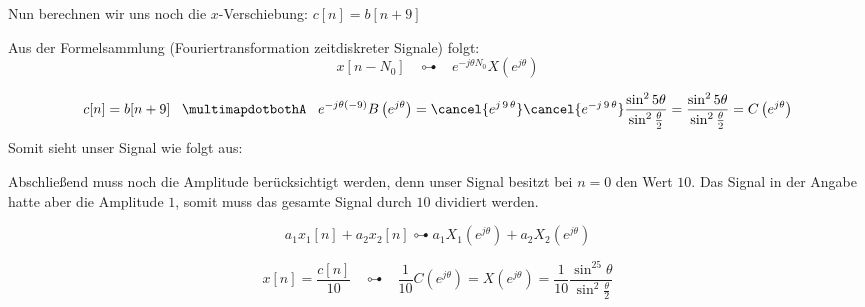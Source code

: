 \begin{uebsp}
\begin{Answer}
\begin{enumerate}[a)]
            Nun berechnen wir uns noch die $x$-Verschiebung: $c[n]=b[n+9]$
               \begin{uebsp_theory}
                    Aus der Formelsammlung (Fouriertransformation zeitdiskreter
                    Signale) folgt:
                    \[x[n-N_0]\;\;\;\multimapdotbothA\;\;\;e^{-j\theta N_0}X\left(e^{j\theta}\right)\]
                \end{uebsp_theory}
                \[c[n]=b[n+9]\;\;\;\multimapdotbothA\;\;\;e^{-j\theta
                    (-9)}B\left(e^{j\theta}\right)=\cancel{e^{j\,9\,\theta
                    }}\cancel{e^{-j\,9\,\theta}}\frac{
            \sin^25\theta}{\sin^2\frac{\theta}{2}}=\frac{
        \sin^25\theta}{\sin^2\frac{\theta}{2}}=C\left(e^{j\theta}\right)\]
        Somit sieht unser Signal wie folgt aus:
            \begin{center}
                \end{center}
        Abschließend muss noch die Amplitude berücksichtigt werden, denn unser
        Signal besitzt bei $n=0$ den Wert $10$. Das Signal in der Angabe hatte
        aber die Amplitude $1$, somit muss das gesamte Signal
        durch $10$ dividiert werden.

            \begin{definition}
                \[a_1x_1[n]+a_2x_2[n]\multimapdotbothA
                a_1X_1(e^{j\theta})+a_2X_2(e^{j\theta})\]
            \end{definition}
            \[x[n]=\frac{c[n]}{10}\;\;\;\multimapdotbothA\;\;\;\frac{1}{10}C\left(e^{j\theta}\right)=X\left(e^{j\theta}\right)=\frac{1}{10}\frac{
        \sin^25\theta}{\sin^2\frac{\theta}{2}}\]
    \end{enumerate}
\end{Answer}
\end{uebsp}
